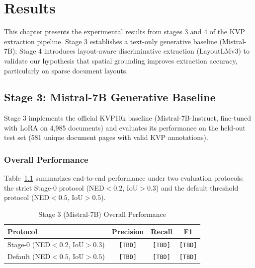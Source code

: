 % 

\chapter{Results}
\label{ch:results}

This chapter presents the experimental results from stages 3 and 4 of the KVP extraction pipeline. Stage 3 establishes a text-only generative baseline (Mistral-7B); Stage 4 introduces layout-aware discriminative extraction (LayoutLMv3) to validate our hypothesis that spatial grounding improves extraction accuracy, particularly on sparse document layouts.

\section{Stage 3: Mistral-7B Generative Baseline}
\label{sec:results_stage3}

Stage 3 implements the official KVP10k baseline (Mistral-7B-Instruct, fine-tuned with LoRA on 4,985 documents) and evaluates its performance on the held-out test set (581 unique document pages with valid KVP annotations).

\subsection{Overall Performance}
\label{sec:stage3_overall}

Table~\ref{tab:stage3_overall} summarizes end-to-end performance under two evaluation protocols: the strict Stage-0 protocol (NED$<0.2$, IoU$>0.3$) and the default threshold protocol (NED$<0.5$, IoU$>0.5$).

\begin{table}[ht]
\centering
\caption{Stage 3 (Mistral-7B) Overall Performance}
\label{tab:stage3_overall}
\begin{tabular}{@{}lccc@{}}
\toprule
\textbf{Protocol} & \textbf{Precision} & \textbf{Recall} & \textbf{F1} \\
\midrule
Stage-0 (NED$<0.2$, IoU$>0.3$) & \texttt{[TBD]} & \texttt{[TBD]} & \texttt{[TBD]} \\
Default (NED$<0.5$, IoU$>0.5$) & \texttt{[TBD]} & \texttt{[TBD]} & \texttt{[TBD]} \\
\bottomrule
\end{tabular}
\end{table}

